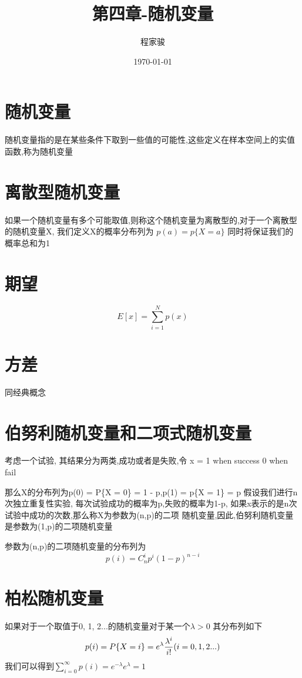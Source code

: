 \documentclass[UTF8]{ctexart}
\title{第四章-随机变量}
\author{程家骏}
\date{\today}
\begin{document}
\maketitle
\section{随机变量}
随机变量指的是在某些条件下取到一些值的可能性,这些定义在样本空间上的实值函数,称为随机变量
\section{离散型随机变量}
如果一个随机变量有多个可能取值,则称这个随机变量为离散型的,对于一个离散型的随机变量X, 我们定义X的概率分布列为
$p(a) = p\{X=a\}$ 同时将保证我们的概率总和为1

\section{期望}
\begin{equation}
    E[x] = \sum_{i=1}^N p(x)
\end{equation}
\section{方差}
同经典概念
\section{伯努利随机变量和二项式随机变量}

考虑一个试验, 其结果分为两类,成功或者是失败,令 x = 1 when success 0 when fail

那么X的分布列为p(0) = P\{X = 0\} = 1 - p,p(1) = p\{X = 1\} = p
假设我们进行n次独立重复性实验, 每次试验成功的概率为p,失败的概率为1-p, 如果x表示的是n次试验中成功的次数,那么称X为参数为(n,p)的二项
随机变量,因此,伯努利随机变量是参数为(1,p)的二项随机变量

参数为(n,p)的二项随机变量的分布列为
\begin{equation}
    p(i) = C_n^i p^i(1-p)^{n-i}
\end{equation}
\section{柏松随机变量}
如果对于一个取值于0, 1, 2...的随机变量对于某一个$\lambda > 0$ 其分布列如下
\begin{equation}
    p(i) = P\{X = i\} = e^{\lambda}\frac{\lambda^i}{i!}\space\space( i = 0,1,2...)
\end{equation}
我们可以得到$\sum_{i=0}^{\infty}p(i) = e^{-\lambda}e^{\lambda} = 1$
\end{document}
